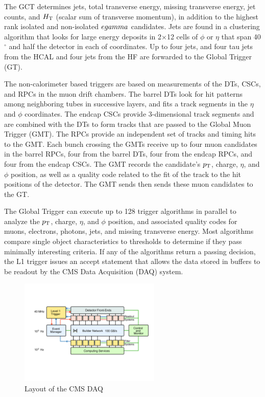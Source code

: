 \par The GCT determines jets, total transverse energy, missing
transverse energy, jet counts, and $H_{\mathrm{T}}$ (scalar sum of transverse
momentum), in addition to the highest rank isolated and non-isolated
$e\/gamma$ candidates.  Jets are found in a clustering algorithm that
looks for large energy deposits in 2$\times$12 cells of $\phi$ or
$\eta$ that span 40$^{\circ}$ and half the detector in each of
coordinates.  Up to four jets, and four tau jets from the HCAL and
four jets from the HF are forwarded to the Global Trigger (GT).  

 \par The non-calorimeter based triggers are based on measurements of
 the DTs, CSCs, and RPCs in the muon drift chambers.  The barrel DTs
 look for hit patterns among neighboring tubes in successive layers,
 and fits a track segments in the $\eta$ and $\phi$ coordinates.  The
 endcap CSCs provide 3-dimensional track segments and are combined
 with the DTs to form tracks that are passed to the Global Muon
 Trigger (GMT).  The RPCs provide an independent set of tracks and
 timing hits to the GMT.  Each bunch crossing the GMTs receive up to
 four muon candidates in the barrel RPCs, four from the barrel DTs,
 four from the endcap RPCs, and four from the endcap CSCs.  The GMT
 records the candidate's $p_{\mathrm{T}}$, charge, $\eta$, and $\phi$ position,
 as well as a quality code related to the fit of the track to the hit
 positions of the detector.  The GMT sends then sends these muon
 candidates to the GT.  

\par The Global Trigger can execute up to 128 trigger algorithms in
parallel to analyze the $p_{\mathrm{T}}$, charge, $\eta$, and $\phi$ position,
and associated quality codes for muons, electrons, photons, jets, and
missing transverse energy.  Most algorithms compare single object
characteristics to thresholds to determine if they pass minimally
interesting criteria.  If any of the algorithms return a passing
decision, the L1 trigger issues an accept statement that allows the
data stored in buffers to be readout by the CMS Data Acquisition (DAQ)
system.  

\begin{figure}[h]
   \centering
  \includegraphics[width=0.6\textwidth]{Figures/CMS_Diagrams/Trigger__DAQ_layout.pdf}
  \caption{Layout of the CMS DAQ} \label{fig:tigger_daq}
\end{figure}

